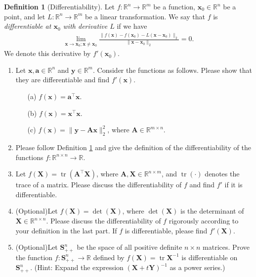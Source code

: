\documentclass[11pt,letter,notitlepage]{article}
\newcommand{\tr}{ \operatorname{tr}  }
\theoremstyle{definition}
\newtheorem{definition}{Definition}
\begin{document}
	
	\newpage
	
	\begin{exercise}
	
	\begin{definition}[Differentiability]\cite{Tao}\label{def:diff}
	    Let $f:\mathbb{R}^n\rightarrow\mathbb{R}^m$ be a function, $\mathbf{x}_0\in\mathbb{R}^n$ be a point, and let $L:\mathbb{R}^n\rightarrow\mathbb{R}^m$ be a linear transformation. We say that $f$ is \emph{differentiable at $\mathbf{x}_0$ with derivative $L$} if we have
	    \begin{align*}
	        \lim_{\mathbf{x}\rightarrow\mathbf{x}_0;\mathbf{x}\neq\mathbf{x}_0}\frac{\|f(\mathbf{x})-f(\mathbf{x}_0)-L(\mathbf{x}-\mathbf{x}_0)\|_2}{\|\mathbf{x}-\mathbf{x}_0\|_2}=0.
	    \end{align*}
	    We denote this derivative by $f'(\mathbf{x}_0)$.
	\end{definition}
		\begin{enumerate}
			\item 	Let $\mathbf{x},\mathbf{a}\in \mathbb{R}^n$ and $\mathbf{y}\in \mathbb{R}^m$. Consider the functions as follows. Please show that they are differentiable and find $f'(\mathbf{x})$.
			\begin{enumerate}
				\item[(a)] $f(\mathbf{x}) = \mathbf{a}^{\top}\mathbf{x}$.
				\item[(b)] $f(\mathbf{x}) = \mathbf{x}^{\top}\mathbf{x}$.
				\item[(c)] $f(\mathbf{x})=\| \mathbf{y} - \mathbf{A}\mathbf{x} \|_2^2$, where $\mathbf{A}\in\mathbb{R}^{m\times n}$.
			\end{enumerate}
			\item Please follow Definition \ref{def:diff} and give the definition of the differentiability of the functions $f:\mathbb{R}^{n\times n}\rightarrow\mathbb{R}$.
			\item Let $f(\mathbf{X})=\tr(\mathbf{A}^{\top}\mathbf{X})$, where $\mathbf{A},\mathbf{X}\in\mathbb{R}^{n\times m}$, and $\tr(\cdot)$ denotes the trace of a matrix. Please discuss the differentiability of $f$ and find $f'$ if it is differentiable.
			\item (Optional)Let $f(\mathbf{X}) = \det(\mathbf{X})$, where $\det(\mathbf{X})$ is the determinant of $\mathbf{X} \in \mathbb{R}^{n \times n}$. Please discuss the differentiability of $f$ rigorously according to your definition in the last part. If $f$ is differentiable, please find $f'(\mathbf{X})$.
			\item (Optional)Let $\mathbf{S}_{++}^n$ be the space of all positive definite $n\times n$ matrices. Prove the function $f: \mathbf{S}_{++}^{n} \rightarrow \mathbb{R}$ defined by $f(\mathbf{X})=\tr{\mathbf{X}^{-1}}$ is differentiable on $ \mathbf{S}_{++}^{n} $. (Hint: Expand the expression $(\mathbf{X}+t\mathbf{Y})^{-1}$ as a power series.)
		\end{enumerate}
	\end{exercise}
	
\end{document}
